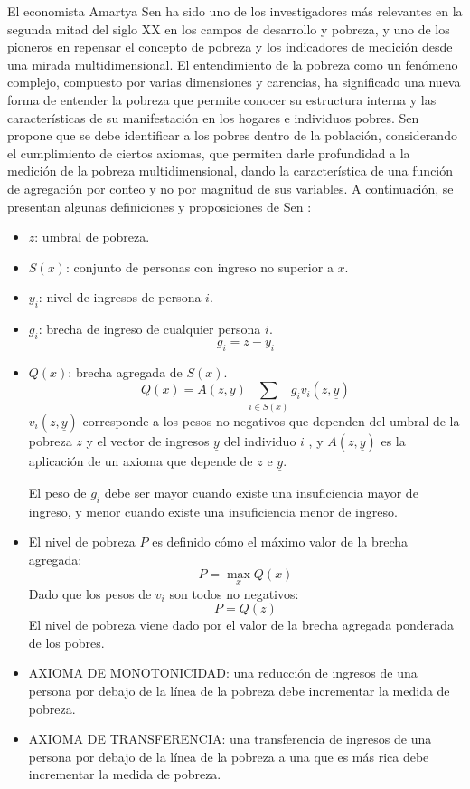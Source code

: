 \documentclass[12pt,letterpaper,spanish]{article}
\begin{document}
El economista Amartya Sen ha sido uno de los investigadores más relevantes en la segunda mitad del siglo XX en los campos de desarrollo y pobreza, y uno de los pioneros en repensar el concepto de pobreza y los indicadores de medición desde una mirada multidimensional. El entendimiento de la pobreza como un fenómeno complejo, compuesto por varias dimensiones y carencias, ha significado una nueva forma de entender la pobreza que permite conocer su estructura interna y las características de su manifestación en los hogares e individuos pobres. Sen propone que se debe identificar a los pobres dentro de la población, considerando el cumplimiento de ciertos axiomas, que permiten darle profundidad a la medición de la pobreza multidimensional, dando la característica de una función de agregación por conteo y no por magnitud de sus variables. A continuación, se presentan algunas definiciones y proposiciones de Sen \cite{Sen1976Poverty:Measurement}:

\begin{itemize}
\item $z$: umbral de pobreza.

\item $S(x)$: conjunto de personas con ingreso no superior a $x$.
\item $y_{i}$: nivel de ingresos de persona $i$.
\item $g_{i}$: brecha de ingreso de cualquier persona $i$.
\[g_{i}=z-y_{i}\]
\item $Q(x)$: brecha agregada de $S(x)$.
\[Q(x)=A(z,y)\sum_{i\in S(x)}g_{i} v_{i}(z,\underline{y})\]
$v_{i}(z,\underline{y})$ corresponde a los pesos no negativos que dependen del umbral de la pobreza $z$ y el vector de ingresos $\underline{y}$ del individuo $i$ , y $A(z,\underline{y})$ es la aplicación de un axioma que depende de $z$ e $\underline{y}$. 

El peso de $g_{i}$ debe ser mayor cuando existe una insuficiencia mayor de ingreso, y menor cuando existe una insuficiencia menor de ingreso.
\item El nivel de pobreza $P$ es definido cómo el máximo valor de la brecha agregada:
\[P=\max_{x}Q(x)\]
Dado que los pesos de $v_{i}$ son todos no negativos:
\[P=Q(z)\]
El nivel de pobreza viene dado por el valor de la brecha agregada ponderada de los pobres.

\item AXIOMA DE MONOTONICIDAD: una reducción de ingresos de una persona por debajo de la línea de la pobreza debe incrementar la medida de pobreza.
\item AXIOMA DE TRANSFERENCIA: una transferencia de ingresos de una persona por debajo de la línea de la pobreza a una que es más rica debe incrementar la medida de pobreza.
\end{itemize}
\end{document}
